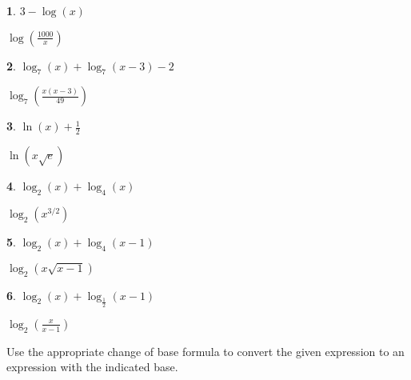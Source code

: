 \documentclass{amsbook}
\newtheorem{exc}{}
\newenvironment{ex}{\begin{exc}\normalfont}{\end{exc}}
\numberwithin{section}{chapter}
\numberwithin{equation}{chapter}
\begin{document}
\begin{multicols}{2}
\begin{ex}
	$3 - \log(x)$
	\begin{sol}
		$\log\left(\frac{1000}{x}\right)$
	\end{sol}
\end{ex}


\begin{ex}
	 $\log_{7}(x) + \log_{7}(x - 3) - 2$
	\begin{sol}
		$\log_{7}\left(\frac{x(x - 3)}{49}\right)$
	\end{sol}
\end{ex}

\begin{ex}
	$\ln(x) + \frac{1}{2}$ 
	\begin{sol}
		$\ln \left(x \sqrt{e} \right)$
	\end{sol}
\end{ex}

\begin{ex}
	$\log_{2}(x) + \log_{4}(x)$ 
	\begin{sol}
		$\log_{2}\left(x^{3/2}\right)$
	\end{sol}
\end{ex}


\begin{ex}
	$\log_{2}(x) + \log_{4}(x-1)$
	\begin{sol}
		$\log_{2}\left(x \sqrt{x-1}\right)$
	\end{sol}
\end{ex}


\begin{ex}
	 $\log_{2}(x) + \log_{\frac{1}{2}}(x - 1)$
	\begin{sol}
		$\log_{2}\left(\frac{x}{x - 1}\right)$ 
	\end{sol}
\end{ex}
\end{multicols}

Use the appropriate change of base formula to convert the given expression to an expression with the indicated base. 
\end{document}
